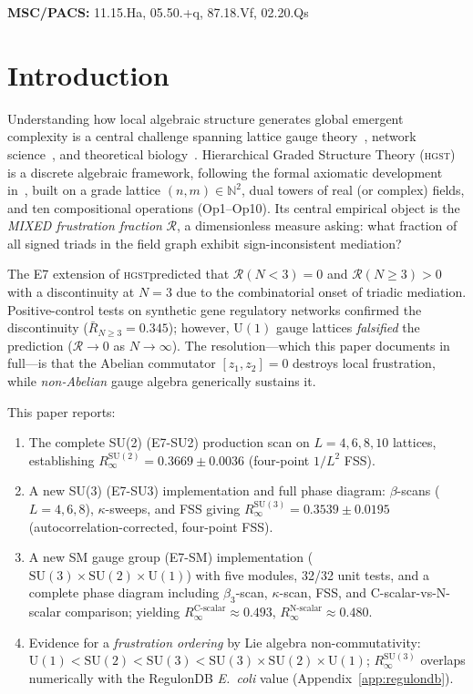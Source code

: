 \documentclass[12pt,a4paper]{article}
\newcommand{\R}{\mathcal{R}}           %
\newcommand{\hgst}{\textsc{hgst}}
\newcommand{\SU}[1]{\mathrm{SU}(#1)}
\newcommand{\UN}[1]{\mathrm{U}(#1)}
\newcommand{\SM}{\SU{3}\!\times\!\SU{2}\!\times\!\UN{1}}
\theoremstyle{plain}
\theoremstyle{definition}
\theoremstyle{remark}
\begin{document}
\vspace{6pt}
\noindent\textbf{MSC/PACS:} 11.15.Ha, 05.50.+q, 87.18.Vf, 02.20.Qs

\newpage
\tableofcontents
\newpage

\section{Introduction}
\label{sec:intro}

Understanding how local algebraic structure generates global emergent complexity is a
central challenge spanning lattice gauge theory~\citep{Wilson1974}, network
science~\citep{Barabasi2004}, and theoretical biology~\citep{Alon2007}.
Hierarchical Graded Structure Theory (\hgst) is a discrete algebraic framework,
following the formal axiomatic development in~\cite{TheoreticalCompanion},
built on a grade lattice $(n,m)\in\mathbb{N}^2$, dual towers of real (or
complex) fields, and ten compositional operations (Op1--Op10).
Its central empirical object is the \emph{MIXED frustration fraction} $\R$, 
a dimensionless measure asking: what fraction of all signed triads in the field graph
exhibit sign-inconsistent mediation?

The E7 extension of \hgst predicted that $\R(N<3)=0$ and $\R(N\geq 3)>0$ with a
discontinuity at $N=3$ due to the combinatorial onset of triadic mediation.
Positive-control tests on synthetic gene regulatory networks confirmed the discontinuity
($\bar{R}_{N\ge3}=0.345$); however, $\UN{1}$ gauge lattices \emph{falsified} the
prediction ($\R\to 0$ as $N\to\infty$).
The resolution---which this paper documents in full---is that the Abelian commutator
$[z_1,z_2]=0$ destroys local frustration, while \emph{non-Abelian} gauge algebra
generically sustains it.

This paper reports:
\begin{enumerate}[leftmargin=1.5em]
  \item The complete SU(2) (E7-SU2) production scan on $L=4,6,8,10$ lattices, establishing
        $R_\infty^{\SU{2}}=0.3669\pm0.0036$ (four-point $1/L^2$ FSS).
  \item A new SU(3) (E7-SU3) implementation and full phase diagram:
        $\beta$-scans ($L=4,6,8$), $\kappa$-sweeps, and FSS giving
        $R_\infty^{\SU{3}}=0.3539\pm0.0195$ (autocorrelation-corrected, four-point FSS).
  \item A new SM gauge group (E7-SM) implementation
        ($\SM$) with five modules, 32/32 unit tests, and a complete
        phase diagram including $\beta_3$-scan, $\kappa$-scan, FSS, and
        C-scalar-vs-N-scalar comparison; yielding
        $R_\infty^\text{C-scalar}\approx 0.493$,
        $R_\infty^\text{N-scalar}\approx 0.480$.
  \item Evidence for a \emph{frustration ordering} by Lie algebra
        non-commutativity: $\UN{1}<\SU{2}<\SU{3}<\SM$;
        $R_\infty^{\SU{3}}$ overlaps numerically with the RegulonDB
        \textit{E.~coli} value (Appendix~\ref{app:regulondb}).
\end{enumerate}
\end{document}
